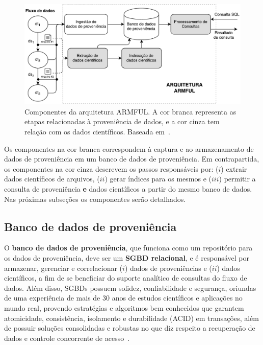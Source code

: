 \begin{figure}[ht]
    \centering
    \includegraphics[width=\textwidth]{img/armful-architecture-simplified}
    \caption[Componentes da arquitetura ARMFUL]{Componentes da arquitetura ARMFUL. A cor branca representa as etapas relacionadas à proveniência de dados, e a cor cinza tem relação com os dados científicos. Baseada em~\cite{silva2017raw}.}%
    \label{fig:armful-architecture-simplified}
\end{figure}

Os componentes na cor branca correspondem à captura e ao armazenamento de dados de proveniência em um banco de dados de proveniência. Em contrapartida, os componentes na cor cinza descrevem os passos responsáveis por: (\(i\)) extrair dados científicos de arquivos, (\(ii\)) gerar índices para os mesmos e (\(iii\)) permitir a consulta de proveniência \textbf{e} dados científicos a partir do mesmo banco de dados. Nas próximas subseções os componentes serão detalhados.

\subsection{Banco de dados de proveniência}%
\label{subsec:banco-de-dados-de-proveniencia}

O \textbf{banco de dados de proveniência}, que funciona como um repositório para os dados de proveniência, deve ser um \textbf{SGBD relacional}, e é responsável por armazenar, gerenciar e correlacionar (\(i\)) dados de proveniências e (\(ii\)) dados científicos, a fim de se beneficiar do suporte analítico de consultas do fluxo de dados. Além disso, SGBDs possuem solidez, confiabilidade e segurança, oriundas de uma experiência de mais de 30 anos de estudos científicos e aplicações no mundo real, provendo estratégias e algoritmos bem conhecidos que garantem atomicidade, consistência, isolamento e durabilidade (ACID) em transações, além de possuir soluções consolidadas e robustas no que diz respeito a recuperação de dados e controle concorrente de acesso~\cite{ozsu2011principles}.


